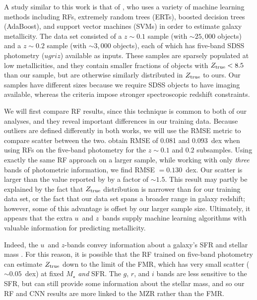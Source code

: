 \documentclass[fleqn,usenatbib]{mnras}
\newcommand{\sdssu}{\hbox{$u$}}
\newcommand{\sdssg}{\hbox{$g$}}
\newcommand{\sdssr}{\hbox{$r$}}
\newcommand{\sdssi}{\hbox{$i$}}
\newcommand{\sdssz}{\hbox{$z$}}
\begin{document}
A study similar to this work is that of \cite{Acquaviva2016}, who uses a variety of machine learning methods including RFs, extremely random trees (ERTs), boosted decision trees (AdaBoost), and support vector machines (SVMs) in order to estimate galaxy metallicity. The \cite{Acquaviva2016} data set consisted of a $z \sim 0.1$ sample (with $\sim 25,000$ objects) and a $z \sim 0.2$ sample (with $\sim 3,000$ objects), each of which has five-band SDSS photometry ($ugriz$) available as inputs. These samples are sparsely populated at low metallicities, and they contain smaller fractions of objects with $Z_{\rm true} < 8.5$ than our sample, but are otherwise similarly distributed in $Z_{\rm true}$ to ours. Our samples have different sizes because we require SDSS objects to have imaging available, whereas the \cite{Acquaviva2016} criteria impose stronger spectroscopic redshift constraints.

We will first compare RF results, since this technique is common to both of our analyses, and they reveal important differences in our training data. Because outliers are defined differently in both works, we will use the RMSE metric to compare scatter between the two. \cite{Acquaviva2016} obtain RMSE of 0.081 and 0.093~dex when using RFs on the five-band photometry for the $z \sim 0.1$ and $0.2$ subsamples. Using exactly the same RF approach on a larger sample, while working with only \textit{three} bands of photometric information, we find RMSE $= 0.130$~dex. Our scatter is larger than the value reported by \cite{Acquaviva2016} by a factor of $\sim 1.5$. This result may partly be explained by the fact that \cite{Acquaviva2016} $Z_{\rm true}$ distribution is narrower than for our training data set, or the fact that our data set spans a broader range in galaxy redshift; however, some of this advantage is offset by our larger sample size.
Ultimately, it appears that the extra \sdssu\ and \sdssz\ bands supply machine learning algorithms with valuable information for predicting metallicity.

Indeed, the \sdssu\ and \sdssz-bands convey information about a galaxy's SFR and stellar mass \cite[see, e.g.,][]{Hopkins2003}. For this reason, it is possible that the RF trained on five-band photometry can estimate $Z_{\rm true}$ down to the limit of the FMR, which has very small scatter ($\sim 0.05$~dex) at fixed $M_{\star}$ \textit{and} SFR. The \sdssg{}, \sdssr{}, and \sdssi{} bands are less sensitive to the SFR, but can still provide some information about the stellar mass, and so our RF and CNN results are more linked to the MZR rather than the FMR.
\end{document}
